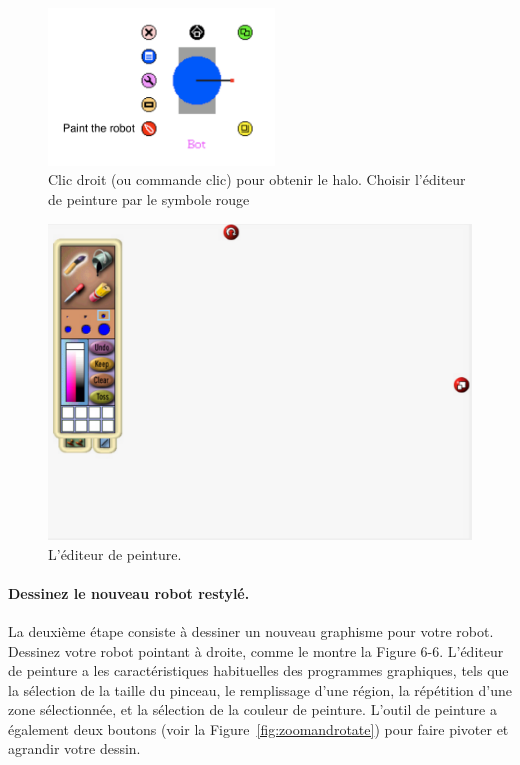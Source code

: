\documentclass[a4paper,10pt,twoside]{book}
\begin{document}
\begin{figure}[h]
\begin{center}
\includegraphics[width=6cm]{picaHaloAnnotated} 
\end{center}
\caption{Clic droit (ou commande clic) pour obtenir le halo. Choisir l'\'editeur de peinture 
par le symbole rouge\label{fig:paintToolCaroFlap}}
\end{figure}

\begin{figure}[h]
\begin{center}
\includegraphics[width=\textwidth]{paintOpen}
\caption{L'\'editeur de peinture. \label{fig:paintOpen}}
\end{center}
\end{figure}

\paragraph{Dessinez le nouveau robot restyl\'e.}

La deuxi\`eme \'etape consiste \`a dessiner un nouveau graphisme pour votre robot. Dessinez votre robot 
pointant \`a droite, comme le montre la Figure 6-6. L'\'editeur de peinture a les caract\'eristiques 
habituelles des programmes graphiques, tels que la s\'election de la taille du pinceau, le 
remplissage d'une r\'egion, la r\'ep\'etition d'une zone s\'electionn\'ee, et la s\'election de la couleur 
de peinture. L'outil de peinture a \'egalement deux boutons (voir la Figure~\ref{fig:zoomandrotate}) 
pour faire pivoter et agrandir votre dessin.
\end{document}
